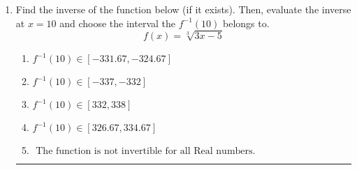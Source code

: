 \documentclass[14pt]{extbook}
\newcommand{\litem}[1]{\item#1\hspace*{-1cm}\rule{\textwidth}{0.4pt}}
\begin{document}
\begin{enumerate}
{\begin{enumerate}[label=\Alph*.]
\end{enumerate} }
\litem{
Find the inverse of the function below (if it exists). Then, evaluate the inverse at $x = 10$ and choose the interval the $f^{-1}(10)$ belongs to.\[ f(x) = \sqrt[3]{3 x - 5} \]\begin{enumerate}[label=\Alph*.]
\item \( f^{-1}(10) \in [-331.67, -324.67] \)
\item \( f^{-1}(10) \in [-337, -332] \)
\item \( f^{-1}(10) \in [332, 338] \)
\item \( f^{-1}(10) \in [326.67, 334.67] \)
\item \( \text{ The function is not invertible for all Real numbers. } \)

\end{enumerate} }
\end{enumerate}
\end{document}
